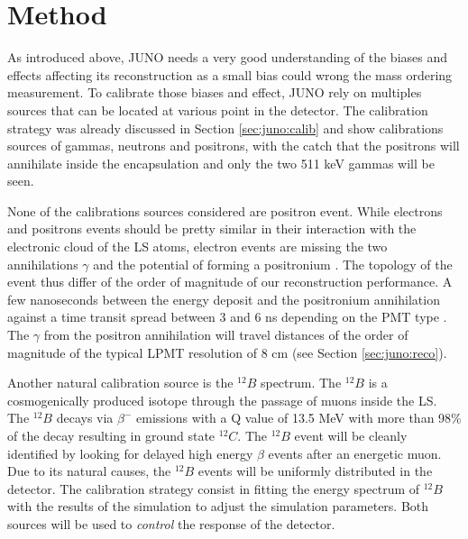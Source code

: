 \documentclass[../main.tex]{subfiles}
\begin{document}
\section{Method}
\label{sec:janne:method}

As introduced above, JUNO needs a very good understanding of the biases and effects affecting its reconstruction as a small bias could wrong the mass ordering measurement. To calibrate those biases and effect, JUNO rely on multiples sources that can be located at various point in the detector. The calibration strategy was already discussed in Section \ref{sec:juno:calib} and show calibrations sources of gammas, neutrons and positrons, with the catch that the positrons will annihilate inside the encapsulation and only the two 511 keV gammas will be seen.

None of the calibrations sources considered are positron event. While electrons and positrons events should be pretty similar in their interaction with the electronic cloud of the LS atoms, electron events are missing the two annihilations $\gamma$ and the potential of forming a positronium \cite{schwarz_measurements_2018}. The topology of the event thus differ of the order of magnitude of our reconstruction performance. A few nanoseconds between the energy deposit and  the positronium annihilation against a time transit spread between 3 and 6 ns depending on the PMT type \cite{rodphai_20-inch_2021, liao_study_2017, li_characterization_2018}. The $\gamma$ from the positron annihilation will travel distances of the order of magnitude of the typical LPMT resolution of 8 cm (see Section \ref{sec:juno:reco}).

Another natural calibration source is the $^{12}B$ spectrum. The $^{12}B$ is a cosmogenically produced isotope through the passage of muons inside the LS. The $^{12}B$ decays via $\beta^-$ emissions with a Q value of 13.5 MeV with more than 98\% of the decay resulting in ground state $^{12}C$. The $^{12}B$ event will be cleanly identified by looking for delayed high energy $\beta$ events after an energetic muon. Due to its natural causes, the $^{12}B$ events will be uniformly distributed in the detector. The calibration strategy consist in fitting the energy spectrum of $^{12}B$ with the results of the simulation to adjust the simulation parameters. Both sources will be used to \textit{control} the response of the detector.
\end{document}
